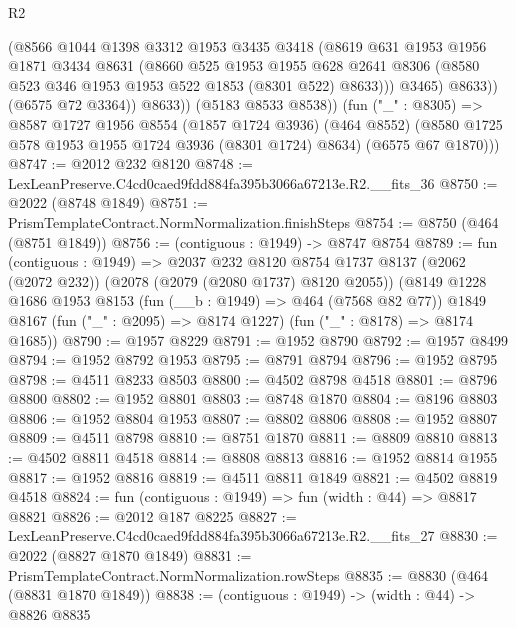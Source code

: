 \begin{lexlean}{R2}
\begin{coremodule}
                  (@8566
                    @1044
                    @1398
                    @3312
                    @1953
                    @3435
                    @3418
                    (@8619
                      @631
                      @1953
                      @1956
                      @1871
                      @3434
                      @8631
                      (@8660
                        @525
                        @1953
                        @1955
                        @628
                        @2641
                        @8306
                        (@8580 @523 @346 @1953 @1953 @522 @1853 (@8301 @522) @8633)))
                    @3465)
                  @8633))
              (@6575 @72 @3364))
            @8633))
        (@5183 @8533 @8538))
      (fun ("_" : @8305) =>
      @8587
        @1727
        @1956
        @8554
        (@1857 @1724 @3936)
        (@464 @8552)
        (@8580 @1725 @578 @1953 @1955 @1724 @3936 (@8301 @1724) @8634)
        (@6575 @67 @1870)))
@8747 := @2012 @232 @8120
@8748 := LexLeanPreserve.C4cd0caed9fdd884fa395b3066a67213e.R2.__fits_36
@8750 := @2022 (@8748 @1849)
@8751 := PrismTemplateContract.NormNormalization.finishSteps
@8754 := @8750 (@464 (@8751 @1849))
@8756 := (contiguous : @1949) -> @8747 @8754
@8789 := fun (contiguous : @1949) =>
  @2037
    @232
    @8120
    @8754
    @1737
    @8137
    (@2062 (@2072 @232))
    (@2078 (@2079 (@2080 @1737) @8120 @2055))
    (@8149
      @1228
      @1686
      @1953
      @8153
      (fun (__b : @1949) => @464 (@7568 @82 @77))
      @1849
      @8167
      (fun ("_" : @2095) => @8174 @1227)
      (fun ("_" : @8178) => @8174 @1685))
@8790 := @1957 @8229
@8791 := @1952 @8790
@8792 := @1957 @8499
@8794 := @1952 @8792 @1953
@8795 := @8791 @8794
@8796 := @1952 @8795
@8798 := @4511 @8233 @8503
@8800 := @4502 @8798 @4518
@8801 := @8796 @8800
@8802 := @1952 @8801
@8803 := @8748 @1870
@8804 := @8196 @8803
@8806 := @1952 @8804 @1953
@8807 := @8802 @8806
@8808 := @1952 @8807
@8809 := @4511 @8798
@8810 := @8751 @1870
@8811 := @8809 @8810
@8813 := @4502 @8811 @4518
@8814 := @8808 @8813
@8816 := @1952 @8814 @1955
@8817 := @1952 @8816
@8819 := @4511 @8811 @1849
@8821 := @4502 @8819 @4518
@8824 := fun (contiguous : @1949) => fun (width : @44) => @8817 @8821
@8826 := @2012 @187 @8225
@8827 := LexLeanPreserve.C4cd0caed9fdd884fa395b3066a67213e.R2.__fits_27
@8830 := @2022 (@8827 @1870 @1849)
@8831 := PrismTemplateContract.NormNormalization.rowSteps
@8835 := @8830 (@464 (@8831 @1870 @1849))
@8838 := (contiguous : @1949) -> (width : @44) -> @8826 @8835

\end{coremodule}
\end{lexlean}
